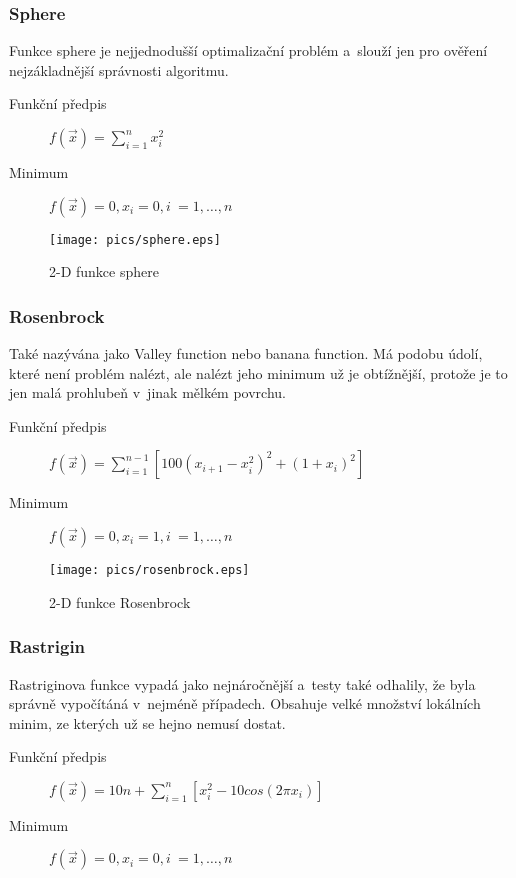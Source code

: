 \documentclass[12pt,a4paper,fleqn]{article}
\begin{document}
\subsubsection*{Sphere}
Funkce sphere je nejjednodušší optimalizační problém a~slouží jen pro ověření nejzákladnější správnosti algoritmu.
\begin{description}
\item[Funkční předpis] $f(\vec{x}) = \sum\limits_{i=1}^n x_i^2$
\item[Minimum] $f(\vec{x}) = 0, x_i = 0, i~= 1,\dots,n$
\end{description}
\begin{figure*}[h]
\centering
\texttt{[image: pics/sphere.eps]}
\caption{2-D funkce sphere}
\end{figure*}

\subsubsection*{Rosenbrock}
Také nazývána jako Valley function nebo banana function. Má podobu údolí, které není problém nalézt, ale nalézt jeho minimum už je obtížnější, protože je to jen malá prohlubeň v~jinak mělkém povrchu.
\begin{description}
\item[Funkční předpis] $f(\vec{x}) = \sum\limits_{i=1}^{n-1} [100(x_{i+1} - x_i^2)^2 + (1 + x_i)^2]$
\item[Minimum] $f(\vec{x}) = 0, x_i = 1, i~= 1,\dots,n$
\end{description}
\begin{figure*}[h]
\centering
\texttt{[image: pics/rosenbrock.eps]}
\caption{2-D funkce Rosenbrock}
\end{figure*}

\subsubsection*{Rastrigin}
Rastriginova funkce vypadá jako nejnáročnější a~testy také odhalily, že byla správně vypočítáná v~nejméně případech. Obsahuje velké množství lokálních minim, ze kterých už se hejno nemusí dostat.

\begin{description}
\item[Funkční předpis] $f(\vec{x}) = 10n + \sum\limits_{i=1}^n [x_i^2 - 10 cos (2 \pi x_i)]$
\item[Minimum] $f(\vec{x}) = 0, x_i = 0, i~= 1,\dots,n$
\end{description}
\end{document}
